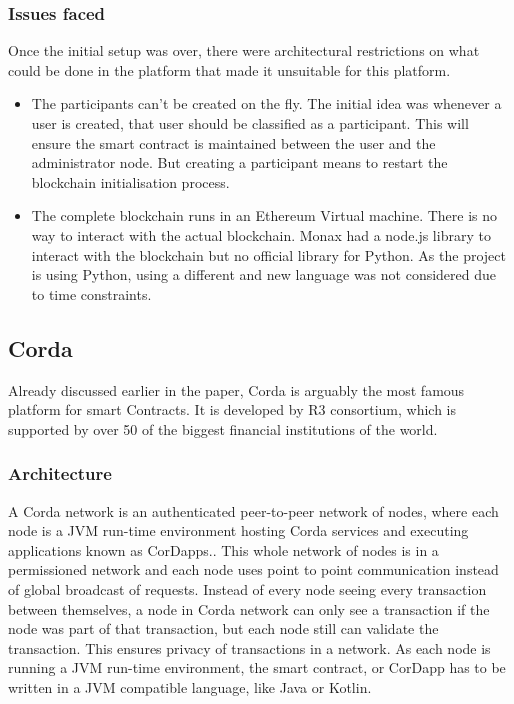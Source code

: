 \subsubsection{Issues faced}
Once the initial setup was over, there were architectural restrictions on what could be done in the platform that made it unsuitable for this platform. 
\begin{itemize}
    \item The participants can't be created on the fly. The initial idea was whenever a user is created, that user should be classified as a participant. This will ensure the smart contract is maintained between the user and the administrator node. But creating a participant means to restart the blockchain initialisation process.
    \item The complete blockchain runs in an Ethereum Virtual machine. There is no way to interact with the actual blockchain. Monax had a node.js library to interact with the blockchain but no official library for Python. As the project is using Python, using a different and new language was not considered due to time constraints.
\end{itemize}

\subsection{Corda}
Already discussed earlier in the paper, Corda is arguably the most famous platform for smart Contracts. It is developed by R3 consortium, which is supported by over 50 of the biggest financial institutions of the world.
\subsubsection{Architecture}
A Corda network is an authenticated peer-to-peer network of nodes, where each node is a JVM run-time environment hosting Corda services and executing applications known as CorDapps.\cite{Hearn2016Corda:Ledger}. This whole network of nodes is in a permissioned network and each node uses point to point communication instead of global broadcast of requests. Instead of every node seeing every transaction between themselves, a node in Corda network can only see a transaction if the node was part of that transaction, but each node still can validate the transaction. This ensures privacy of transactions in a network.
As each node is running a JVM run-time environment, the smart contract, or CorDapp has to be written in a JVM compatible language, like Java or Kotlin.

